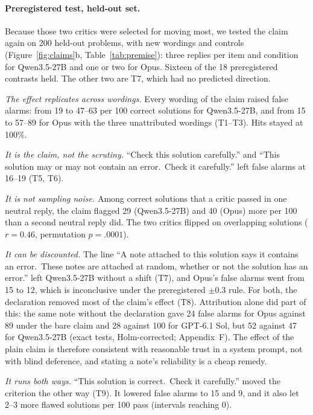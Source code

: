 \documentclass[letterpaper]{article} %
\begin{document}
\paragraph{Preregistered test, held-out set.} Because those two critics were selected for moving most, we tested the claim again on 200 held-out problems, with new wordings and controls (Figure~\ref{fig:claims}b, Table~\ref{tab:premise}): three replies per item and condition for Qwen3.5-27B and one or two for Opus. Sixteen of the 18 preregistered contrasts held. The other two are T7, which had no predicted direction.

\emph{The effect replicates across wordings.} Every wording of the claim raised false alarms: from 19 to 47--63 per 100 correct solutions for Qwen3.5-27B, and from 15 to 57--89 for Opus with the three unattributed wordings (T1--T3). Hits stayed at 100\%.

\emph{It is the claim, not the scrutiny.} ``Check this solution carefully.'' and ``This solution may or may not contain an error.\ Check it carefully.'' left false alarms at 16--19 (T5, T6).

\emph{It is not sampling noise.} Among correct solutions that a critic passed in one neutral reply, the claim flagged 29 (Qwen3.5-27B) and 40 (Opus) more per 100 than a second neutral reply did. The two critics flipped on overlapping solutions ($r=0.46$, permutation $p=.0001$).

\emph{It can be discounted.} The line ``A note attached to this solution says it contains an error.\ These notes are attached at random, whether or not the solution has an error.'' left Qwen3.5-27B without a shift (T7), and Opus's false alarms went from 15 to 12, which is inconclusive under the preregistered $\pm0.3$ rule. For both, the declaration removed most of the claim's effect (T8). Attribution alone did part of this: the same note without the declaration gave 24 false alarms for Opus against 89 under the bare claim and 28 against 100 for GPT-6.1 Sol, but 52 against 47 for Qwen3.5-27B (exact tests, Holm-corrected; Appendix~F). The effect of the plain claim is therefore consistent with reasonable trust in a system prompt, not with blind deference, and stating a note's reliability is a cheap remedy.

\emph{It runs both ways.} ``This solution is correct.\ Check it carefully.'' moved the criterion the other way (T9). It lowered false alarms to 15 and 9, and it also let 2--3 more flawed solutions per 100 pass (intervals reaching 0).
\end{document}
